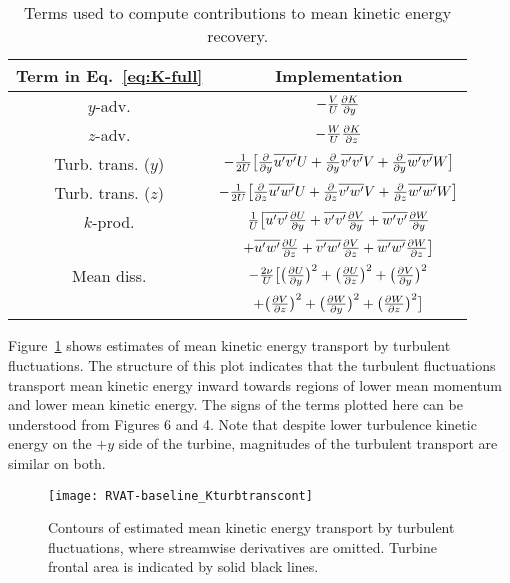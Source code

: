 \begin{table}
    \centering
    \begin{tabular}{c|c}
        Term in Eq.~\ref{eq:K-full} & Implementation \\ 
        \hline  
        $y$-adv. & $-\frac{V}{U}\frac{\partial K}{\partial y}$ \\ 
        $z$-adv.  & $-\frac{W}{U}\frac{\partial K}{\partial z}$ \\ 
        Turb. trans. ($y$) & $-\frac{1}{2U} \big{[} \frac{\partial }{\partial y}\overline{u'v'}U 
        + \frac{\partial }{\partial y}\overline{v'v'}V + \frac{\partial }{\partial y}\overline{w'v'}W \big{]} $\\ 
        Turb. trans. ($z$)  & $-\frac{1}{2U} \big{[} \frac{\partial }{\partial z}\overline{u'w'}U 
        + \frac{\partial }{\partial z}\overline{v'w'}V + \frac{\partial }{\partial z}\overline{w'w'}W \big{]} $\\ 
        $k$-prod.  & $\frac{1}{U} \big{[} \overline{u'v'}\frac{\partial U}{\partial y}
        + \overline{v'v'}\frac{\partial V}{\partial y} 
        + \overline{w'v'}\frac{\partial W}{\partial y} $ \\
        & $ + \overline{u'w'}\frac{\partial U}{\partial z}
        + \overline{v'w'}\frac{\partial V}{\partial z}
        + \overline{w'w'}\frac{\partial W}{\partial z}
        \big{]} $ \\ 
        Mean diss.   & $ - \frac{2 \nu}{U} \big{[}
        \big{(} \frac{\partial U}{\partial y} \big{)}^2
        + \big{(} \frac{\partial U}{\partial z} \big{)}^2
        + \big{(} \frac{\partial V}{\partial y} \big{)}^2 $ \\
        & $
        + \big{(} \frac{\partial V}{\partial z} \big{)}^2
        + \big{(} \frac{\partial W}{\partial y} \big{)}^2
        + \big{(} \frac{\partial W}{\partial z} \big{)}^2
        \big{]} $ \\ 
    \end{tabular} 
    \caption{Terms used to compute contributions to mean kinetic energy recovery.}
    \label{tab:RVAT-baseline-eqs}
\end{table}

Figure~\ref{fig:RVAT-baseline-Kturbtrans} shows estimates of mean kinetic energy
transport by turbulent fluctuations. The structure of this plot indicates that
the turbulent fluctuations transport mean kinetic energy inward towards regions
of lower mean momentum and lower mean kinetic energy. The signs of the terms
plotted here can be understood from Figures 6 and 4. Note that despite lower
turbulence kinetic energy on the $+y$ side of the turbine, magnitudes of the
turbulent transport are similar on both.

\begin{figure}
    \centering
    
    \texttt{[image: RVAT-baseline\_Kturbtranscont]}

    \caption{Contours of estimated mean kinetic energy transport by turbulent
        fluctuations, where streamwise derivatives are omitted. Turbine frontal area
        is indicated by solid black lines.}
    
    \label{fig:RVAT-baseline-Kturbtrans}
\end{figure}

